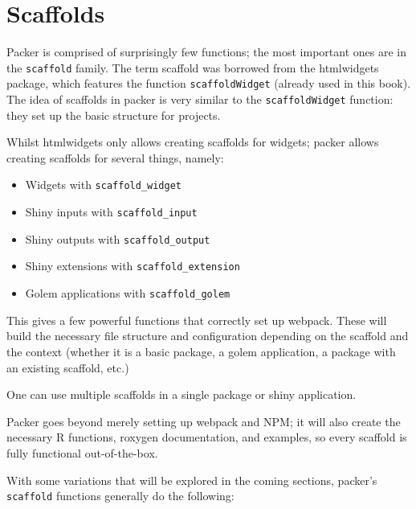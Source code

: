 \documentclass[
  10pt,
]{krantz}
\makeatletter
\providecommand{\tightlist}{%
  \setlength{\itemsep}{0pt}\setlength{\parskip}{0pt}}
\newenvironment{kframe}{%
\medskip{}
\setlength{\fboxsep}{.8em}
 \def\at@end@of@kframe{}%
 \ifinner\ifhmode%
  \def\at@end@of@kframe{\end{minipage}}%
  \begin{minipage}{\columnwidth}%
 \fi\fi%
 \def\FrameCommand##1{\hskip\@totalleftmargin \hskip-\fboxsep
 \colorbox{shadecolor}{##1}\hskip-\fboxsep
     \hskip-\linewidth \hskip-\@totalleftmargin \hskip\columnwidth}%
 \MakeFramed {\advance\hsize-\width
   \@totalleftmargin\z@ \linewidth\hsize
   \@setminipage}}%
 {\par\unskip\endMakeFramed%
 \at@end@of@kframe}
\newenvironment{rmdblock}[1]
  {
  \begin{itemize}
  \renewcommand{\labelitemi}{
    \raisebox{-.7\height}[0pt][0pt]{
      {\setkeys{Gin}{width=3em,keepaspectratio}\texttt{[image: images/\#1]}}
    }
  }
  \setlength{\fboxsep}{1em}
  \begin{kframe}
  \item
  }
  {
  \end{kframe}
  \end{itemize}
  }
\newenvironment{rmdnote}
  {\begin{rmdblock}{note}}
  {\end{rmdblock}}
\makeatother
\begin{document}
\hypertarget{packer-scaffolds}{%
\section{Scaffolds}\label{packer-scaffolds}}

Packer is comprised of surprisingly few functions; the most important ones are in the \texttt{scaffold} family. The term scaffold was borrowed from the htmlwidgets package, which features the function \texttt{scaffoldWidget} (already used in this book). The idea of scaffolds in packer is very similar to the \texttt{scaffoldWidget} function: they set up the basic structure for projects.

Whilst htmlwidgets only allows creating scaffolds for widgets; packer allows creating scaffolds for several things, namely:

\begin{itemize}
\tightlist
\item
  Widgets with \texttt{scaffold\_widget}
\item
  Shiny inputs with \texttt{scaffold\_input}
\item
  Shiny outputs with \texttt{scaffold\_output}
\item
  Shiny extensions with \texttt{scaffold\_extension}
\item
  Golem applications with \texttt{scaffold\_golem}
\end{itemize}

This gives a few powerful functions that correctly set up webpack. These will build the necessary file structure and configuration depending on the scaffold and the context (whether it is a basic package, a golem application, a package with an existing scaffold, etc.)

\begin{rmdnote}
One can use multiple scaffolds in a single package or shiny application.
\end{rmdnote}

Packer goes beyond merely setting up webpack and NPM; it will also create the necessary R functions, roxygen documentation, and examples, so every scaffold is fully functional out-of-the-box.

With some variations that will be explored in the coming sections, packer's \texttt{scaffold} functions generally do the following:
\end{document}
